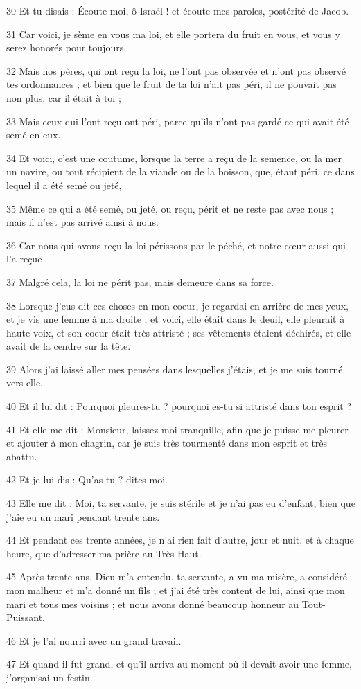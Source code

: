 \par 30 Et tu disais : Écoute-moi, ô Israël ! et écoute mes paroles, postérité de Jacob.
\par 31 Car voici, je sème en vous ma loi, et elle portera du fruit en vous, et vous y serez honorés pour toujours.
\par 32 Mais nos pères, qui ont reçu la loi, ne l'ont pas observée et n'ont pas observé tes ordonnances ; et bien que le fruit de ta loi n'ait pas péri, il ne pouvait pas non plus, car il était à toi ;
\par 33 Mais ceux qui l'ont reçu ont péri, parce qu'ils n'ont pas gardé ce qui avait été semé en eux.
\par 34 Et voici, c'est une coutume, lorsque la terre a reçu de la semence, ou la mer un navire, ou tout récipient de la viande ou de la boisson, que, étant péri, ce dans lequel il a été semé ou jeté,
\par 35 Même ce qui a été semé, ou jeté, ou reçu, périt et ne reste pas avec nous ; mais il n'est pas arrivé ainsi à nous.
\par 36 Car nous qui avons reçu la loi périssons par le péché, et notre cœur aussi qui l'a reçue
\par 37 Malgré cela, la loi ne périt pas, mais demeure dans sa force.
\par 38 Lorsque j'eus dit ces choses en mon coeur, je regardai en arrière de mes yeux, et je vis une femme à ma droite ; et voici, elle était dans le deuil, elle pleurait à haute voix, et son coeur était très attristé ; ses vêtements étaient déchirés, et elle avait de la cendre sur la tête.
\par 39 Alors j'ai laissé aller mes pensées dans lesquelles j'étais, et je me suis tourné vers elle,
\par 40 Et il lui dit : Pourquoi pleures-tu ? pourquoi es-tu si attristé dans ton esprit ?
\par 41 Et elle me dit : Monsieur, laissez-moi tranquille, afin que je puisse me pleurer et ajouter à mon chagrin, car je suis très tourmenté dans mon esprit et très abattu.
\par 42 Et je lui dis : Qu'as-tu ? dites-moi.
\par 43 Elle me dit : Moi, ta servante, je suis stérile et je n'ai pas eu d'enfant, bien que j'aie eu un mari pendant trente ans.
\par 44 Et pendant ces trente années, je n'ai rien fait d'autre, jour et nuit, et à chaque heure, que d'adresser ma prière au Très-Haut.
\par 45 Après trente ans, Dieu m'a entendu, ta servante, a vu ma misère, a considéré mon malheur et m'a donné un fils ; et j'ai été très content de lui, ainsi que mon mari et tous mes voisins ; et nous avons donné beaucoup honneur au Tout-Puissant.
\par 46 Et je l'ai nourri avec un grand travail.
\par 47 Et quand il fut grand, et qu'il arriva au moment où il devait avoir une femme, j'organisai un festin.

